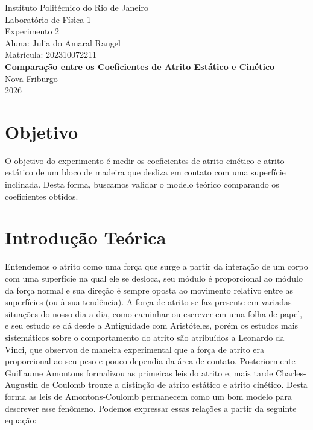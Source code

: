\documentclass[12pt,a4paper]{article}
\begin{document}
\begin{center}
    {\large Instituto Politécnico do Rio de Janeiro}\\[0.15cm]
    {\large Laboratório de Física 1}\\[0.4cm]
    {\large Experimento 2}\\[0.4cm]
    {\large Aluna: Julia do Amaral Rangel}\\[0.15cm]
    {\large Matrícula: 202310072211}\\[0.6cm]
    {\Large\bfseries Comparação entre os Coeficientes de Atrito Estático e Cinético}\\[0.6cm]
    {\large Nova Friburgo}\\[0.15cm]
    {\large 2026}
\end{center}

\newpage
\tableofcontents
\newpage

\section{Objetivo}

O objetivo do experimento é medir os coeficientes de atrito cinético e
atrito estático de um bloco de madeira que desliza em contato com uma
superfície inclinada. Desta forma, buscamos validar o modelo teórico
comparando os coeficientes obtidos.

\section{Introdução Teórica}

Entendemos o atrito como uma força que surge a partir da interação de um
corpo com uma superfície na qual ele se desloca, seu módulo é
proporcional ao módulo da força normal e sua direção é sempre oposta ao
movimento relativo entre as superfícies (ou à sua tendência). A força de
atrito se faz presente em variadas situações do nosso dia-a-dia, como
caminhar ou escrever em uma folha de papel, e seu estudo se dá desde a
Antiguidade com Aristóteles, porém os estudos mais sistemáticos sobre o
comportamento do atrito são atribuídos a Leonardo da Vinci, que observou
de maneira experimental que a força de atrito era proporcional ao seu
peso e pouco dependia da área de contato. Posteriormente Guillaume
Amontons formalizou as primeiras leis do atrito e, mais tarde
Charles-Augustin de Coulomb trouxe a distinção de atrito estático e
atrito cinético. Desta forma as leis de Amontons-Coulomb permanecem como
um bom modelo para descrever esse fenômeno. Podemos expressar essas
relações a partir da seguinte equação:
\end{document}
